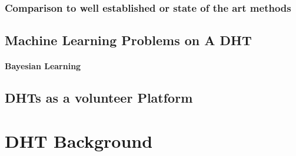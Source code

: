 \documentclass[10pt,letterpaper]{report}
\begin{document}
\subsection{Comparison to well established or state of the art methods}

\section{Machine Learning Problems on A DHT}
\subsubsection{Bayesian Learning}

\section{DHTs as a volunteer Platform}

\chapter{DHT Background}





\end{document}
